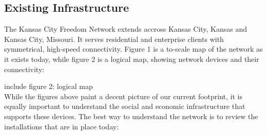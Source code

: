  
\subsection{Existing Infrastructure}
The Kansas City Freedom Network extends accross Kansas City, Kansas and Kansas
City, Missouri. It serves residential and enterprise clients with symmetrical,
high-speed connectivity. Figure 1 is a to-scale map of the network as it exists
today, while figure 2 is a logical map, showing network devices and their
connectivity: \\

\begin{center}
\end{center}
include figure 2: logical map\\

While the figures above paint a decent picture of our current footprint, it is
equally important to understand the social and economic
infrastructure that supports these devices. The best way to understand the
network is to review the installations that are in place today:

